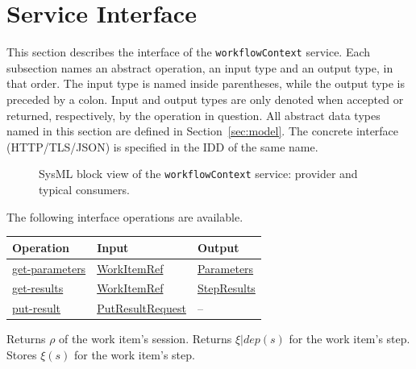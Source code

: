 \documentclass[a4paper]{arrowhead}
\newcommand{\mref}[1]{{\textcolor{ArrowheadPurple}{\hyperref[sec:model:#1]{#1}}}}
\newcommand{\oref}[1]{{\textcolor{ArrowheadBlue}{\hyperref[sec:operations:#1]{#1}}}}
\begin{document}
\newpage
\section{Service Interface}
\label{sec:operations}
This section describes the interface of the \texttt{workflow\allowbreak{}Context} service. Each subsection names an abstract operation,
an input type and an output type, in that order. The input type is named inside parentheses, while the output type is
preceded by a colon. Input and output types are only denoted when accepted or returned, respectively, by the operation
in question. All abstract data types named in this section are defined in Section~\ref{sec:model}. The concrete
interface (HTTP/TLS/JSON) is specified in the IDD of the same name.

\begin{figure}[ht!]
  \centering
  \caption{SysML block view of the \texttt{workflowContext} service: provider and typical consumers.}
  \label{fig:SD}
\end{figure}

The following interface operations are available.

{\small
\begin{longtable}{|p{4.4cm}|p{5.6cm}|p{5.8cm}|}

\hline
\rowcolor{gray!33} Operation & Input & Output \\ \hline
\endhead
\oref{get-parameters} & \mref{WorkItemRef} & \mref{Parameters} \\ \hline
\oref{get-results} & \mref{WorkItemRef} & \mref{StepResults} \\ \hline
\oref{put-result} & \mref{PutResultRequest} & -- \\ \hline
\end{longtable}
}

Returns $\rho$ of the work item's session.
Returns $\xi|dep(s)$ for the work item's step.
Stores $\xi(s)$ for the work item's step.
\end{document}
